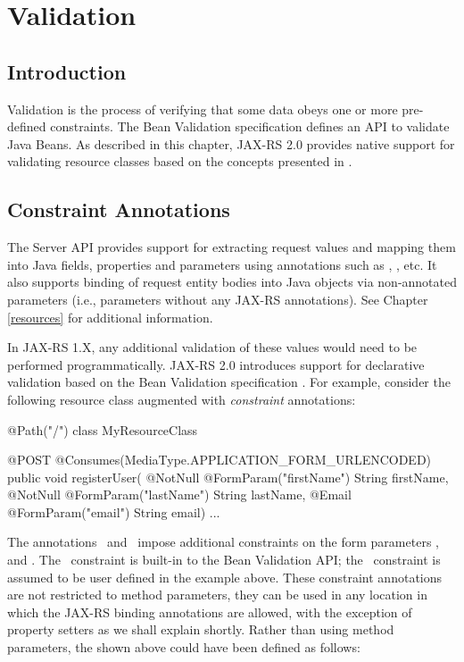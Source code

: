 \chapter{Validation}
\label{validation}

\section{Introduction}
\label{introduction}
Validation is the process of verifying that some data obeys one or more pre-defined constraints. The Bean Validation specification \cite{bv11} defines an API to validate Java Beans. As described in this chapter, JAX-RS 2.0 provides native support for validating resource classes based on the concepts presented in \cite{bv11}.

\section{Constraint Annotations}
\label{constraint_annotations}

The Server API provides support for extracting request values and mapping them into Java fields, properties and parameters using annotations such as , , etc. It also supports binding of request entity bodies into Java objects via non-annotated parameters (i.e., parameters without any JAX-RS annotations). See Chapter \ref{resources} for additional information.

In JAX-RS 1.X, any additional validation of these values would need to be performed programmatically. JAX-RS 2.0 introduces support for declarative validation based on the Bean Validation specification \cite{bv11}. For example, consider the following resource class augmented with \emph{constraint} annotations:

\begin{listing}{1}
@Path("/")
class MyResourceClass {

    @POST
    @Consumes(MediaType.APPLICATION_FORM_URLENCODED)
    public void registerUser(
        @NotNull @FormParam("firstName") String firstName,
        @NotNull @FormParam("lastName") String lastName,
        @Email @FormParam("email") String email) {
        ...
    }
}
\end{listing}

The annotations \NotNull\ and \Email\ impose additional constraints on the form parameters ,  and . The \NotNull\ constraint is built-in to the Bean Validation API; the \Email\ constraint is assumed to be user defined in the example above. These constraint annotations are not restricted to method parameters, they can be used in any location in which the JAX-RS binding annotations are allowed, with the exception of property setters as we shall explain shortly. Rather than using method parameters, the  shown above could have been defined as follows:

